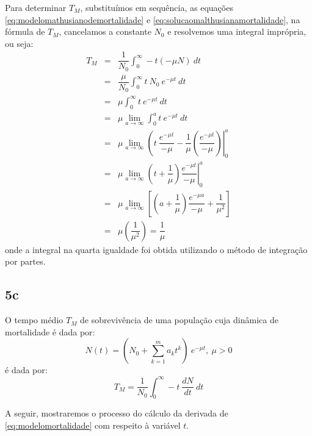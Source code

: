 {Para determinar \(T_M\), substituímos em sequência, as equações \eqref{eq:modelomathusianodemortalidade} e \eqref{eq:solucaomalthusianamortalidade}, na fórmula de \(T_M\), cancelamos a constante \(N_0\) e resolvemos uma integral imprópria, ou seja:
\begin{eqnarray*}
T_M
&=& \dfrac{1}{N_0} \displaystyle\int_{0}^{\infty} -t (-\mu N)\ dt \\
&=& \dfrac{\mu}{N_0} \displaystyle\int_{0}^{\infty} t\ 
N_0\ e^{-\mu t}\ dt \\
&=& 
\mu \displaystyle\int_{0}^{\infty} t\ e^{-\mu t}\ dt \\
&=& 
\mu \displaystyle \lim_{a \to \infty} \int_{0}^{a} t\ e^{-\mu t}\ dt \\
&=& \mu \displaystyle \lim_{a \to \infty} \left(t\ \dfrac{e^{-\mu t}}{-\mu} - \dfrac{1}{\mu} \left(\dfrac{e^{-\mu t}}{-\mu}\right) \right|_{0}^{a} \\
&=& \mu \displaystyle \lim_{a \to \infty} \left.\left(t + \dfrac{1}{\mu}\right) \dfrac{e^{-\mu t}}{-\mu} \right|_{0}^{a} \\
&=& \mu \displaystyle \lim_{a \to \infty} \left[\left(a + \dfrac{1}{\mu}\right) \dfrac{e^{-\mu a}}{-\mu} + \dfrac{1}{\mu^2} \right] \\
&=& \mu \left(\dfrac{1}{\mu^2} \right) = \dfrac{1}{\mu}
\end{eqnarray*}
onde a integral na quarta igualdade foi obtida utilizando o método de integração por partes.



\subsection*{5c}

O tempo médio \(T_M\) de sobrevivência de uma população cuja dinâmica de mortalidade é dada por:
\begin{equation}\label{eq:modelomortalidade}
N(t) = \left(N_0+\displaystyle\sum_{k=1}^{m} a_{k} t^{k}\right)\ e^{-\mu t},\ \mu > 0
\end{equation}
é dada por:
\begin{equation}\label{eq:temposobrevivencia}
T_M = \dfrac{1}{N_0} \displaystyle\int_{0}^{\infty} -t\ \dfrac{dN}{dt}\ dt
\end{equation}


A seguir, mostraremos o processo do cálculo da derivada de \eqref{eq:modelomortalidade} com respeito à variável \(t\).

}

